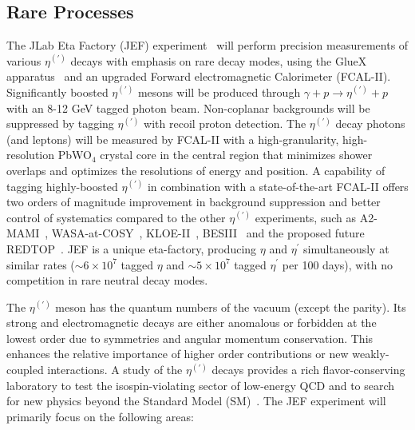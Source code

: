 \subsection{ Rare Processes } 
\label{sec:jefexperiment}

The JLab Eta Factory (JEF) experiment~\cite{pro-JEF17, pro-JEF14} will
perform precision measurements of various $\eta^{(\prime)}$ decays
with emphasis on rare decay modes, using the GlueX
apparatus~\cite{Adhikari:2020cvz} and an upgraded Forward
electromagnetic Calorimeter (FCAL-II).  Significantly boosted
$\eta^{(\prime)}$ mesons will be produced through $\gamma
+p\rightarrow\eta^{(\prime)} +p$ with an 8-12 GeV tagged photon beam.
Non-coplanar backgrounds will be suppressed by tagging
$\eta^{(\prime)}$ with recoil proton detection. The $\eta^{(\prime)}$
decay photons (and leptons) will be measured by FCAL-II with a
high-granularity, high-resolution PbWO$_4$ crystal core in the central
region that minimizes shower overlaps and optimizes the resolutions of
energy and position. A capability of tagging highly-boosted
$\eta^{(\prime)}$ in combination with a state-of-the-art FCAL-II
offers two orders of magnitude improvement in background suppression
and better control of systematics compared to the other
$\eta^{(\prime)}$ experiments, such as A2-MAMI~\cite{Adlarson:2019nwa,
  Kashevarov:2017kqb}, WASA-at-COSY~\cite{Husken:2019dou},
KLOE-II~\cite{Berlowski:2019hst}, BESIII~\cite{Shuang-shiFang:2015vva}
and the proposed future REDTOP~\cite{Gatto:2019dhj}.  JEF is a unique
eta-factory, producing $\eta$ and $\eta^{\prime}$ simultaneously at
similar rates ($\sim 6\times 10^7$ tagged $\eta$ and $\sim 5\times
10^7$ tagged $\eta^{\prime}$ per 100 days), with no competition in
rare neutral decay modes.

The $\eta^{(\prime)}$ meson has the quantum numbers of the vacuum
(except the parity). Its strong and electromagnetic decays are either
anomalous or forbidden at the lowest order due to symmetries and
angular momentum conservation. This enhances the relative importance
of higher order contributions or new weakly-coupled interactions. A
study of the $\eta^{(\prime)}$ decays provides a rich
flavor-conserving laboratory to test the isospin-violating sector of
low-energy QCD and to search for new physics beyond the Standard Model
(SM)~\cite{Gan:2020aco}.  The JEF experiment will primarily focus on
the following areas:



